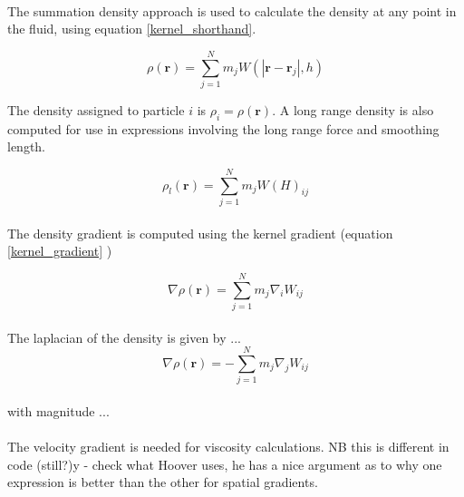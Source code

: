 \paragraph{}
The summation density approach is used to calculate the density at any point in
the fluid, using equation \ref{kernel_shorthand}.

\begin{equation}
\label{density_summation}
\rho(\textbf{r})=\sum_{j=1}^{N}m_{j} 
W\left( \left|\mathbf{r} - \mathbf{r}_{j} \right|,h\right)
\end{equation}

The density assigned to particle $i$ is $\rho_{i} = \rho(\mathbold{r})$. A long
range density is also computed for use in expressions involving the long range
force and smoothing length.

\begin{equation}
\label{density_summation_longrange}
\rho_{l}(\textbf{r})=\sum_{j=1}^{N}m_j W(H)_{ij}
\end{equation}

\paragraph{}
The density gradient is computed using the kernel gradient (equation
\ref{kernel_gradient} ) 

\begin{equation}
\label{density_gradient}
\nabla \rho (\mathbold{r}) = \sum^{N}_{j=1} m_j \nabla_{i} W_{ij} 
\end{equation}

\paragraph{}
The laplacian of the density is given by ...
\begin{equation}
\label{density_laplacian}
\nabla \rho (\mathbold{r}) = - \sum^{N}_{j=1} m_j \nabla_{j} W_{ij} 
\end{equation}

\paragraph{}
with magnitude ...

\paragraph{}
The velocity gradient is needed for viscosity calculations. NB this is
different in code (still?)y - check what Hoover uses, he has a nice argument as to why
one expression is better than the other for spatial gradients.


